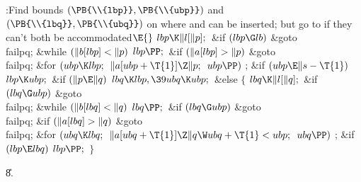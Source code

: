 \Y\B\4:Find bounds $(\PB{\\{lbp}},\PB{\\{ubp}})$ and $(\PB{\\{lbq}},\PB{%
\\{ubq}})$ on where  and  can be inserted; but go to  if they can't both be accommodated\X${}\E{}$\6
$\\{lbp}\K\|l[\|p];{}$\6
\&{if} ${}(\\{lbp}\G\\{lb}){}$\1\5
\&{goto} \\{failpq};\2\6
\&{while} ${}(\|b[\\{lbp}]<\|p){}$\1\5
${}\\{lbp}\PP;{}$\2\6
\&{if} ${}(\|a[\\{lbp}]>\|p){}$\1\5
\&{goto} \\{failpq};\2\6
\&{for} ${}(\\{ubp}\K\\{lbp};{}$ ${}\|a[\\{ubp}+\T{1}]\Z\|p;{}$ ${}\\{ubp}%
\PP){}$\1\5
;\2\6
\&{if} ${}(\\{ubp}\E\|s-\T{1}){}$\1\5
${}\\{lbp}\K\\{ubp};{}$\2\6
\&{if} ${}(\|p\E\|q){}$\1\5
${}\\{lbq}\K\\{lbp},\39\\{ubq}\K\\{ubp};{}$\2\6
\&{else}\5
${}\{{}$\1\6
${}\\{lbq}\K\|l[\|q];{}$\6
\&{if} ${}(\\{lbq}\G\\{ubp}){}$\1\5
\&{goto} \\{failpq};\2\6
\&{while} ${}(\|b[\\{lbq}]<\|q){}$\1\5
${}\\{lbq}\PP;{}$\2\6
\&{if} ${}(\\{lbq}\G\\{ubp}){}$\1\5
\&{goto} \\{failpq};\2\6
\&{if} ${}(\|a[\\{lbq}]>\|q){}$\1\5
\&{goto} \\{failpq};\2\6
\&{for} ${}(\\{ubq}\K\\{lbq};{}$ ${}\|a[\\{ubq}+\T{1}]\Z\|q\W\\{ubq}+\T{1}<%
\\{ubp};{}$ ${}\\{ubq}\PP){}$\1\5
;\2\6
\&{if} ${}(\\{lbp}\E\\{lbq}){}$\1\5
${}\\{lbp}\PP;{}$\2\6
\4${}\}{}$\2\par
\U8.\fi

